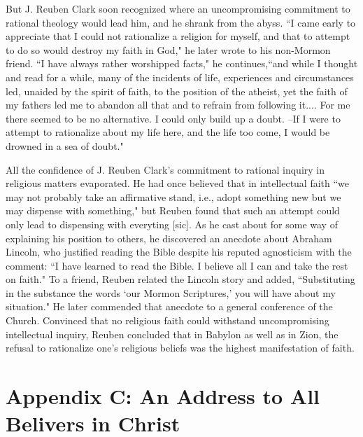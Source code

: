 \documentclass{article}
\begin{document}
But J. Reuben Clark soon recognized where an uncompromising commitment to 
rational theology would lead him, and he shrank from the abyss. 
``I came early to appreciate that I could not rationalize a religion for myself, 
and that to attempt to do so would destroy my faith in God," 
he later wrote to his non-Mormon friend. ``I have always rather worshipped 
facts," he continues,``and while I thought and read for a while, many of the 
incidents of life, experiences and circumstances led, unaided by the spirit of 
faith, to the position of the atheist, yet the faith of my fathers led me to 
abandon all that and to refrain from following it.... For me there seemed to be 
no alternative. I could only build up a doubt. --If I were to attempt to 
rationalize about my life here, and the life too come, I would be drowned in 
a sea of doubt."

All the confidence of J. Reuben Clark's commitment to rational inquiry in 
religious matters evaporated. He had once believed that in intellectual faith 
``we may not probably take an affirmative stand, i.e., adopt something new but 
we may dispense with something," but Reuben found that such an attempt could 
only lead to dispensing with everyting [sic]. As he cast about for some way of 
explaining his position to others, he discovered an anecdote about Abraham 
Lincoln, who justified reading the Bible despite his reputed agnosticism with 
the comment: ``I have learned to read the Bible. I believe all I can and take 
the rest on faith." To a friend, Reuben related the Lincoln story and added, 
``Substituting in the substance the words `our Mormon Scriptures,' you will 
have about my situation." He later commended that anecdote to a general 
conference of the Church. Convinced that no religious faith could withstand 
uncompromising intellectual inquiry, Reuben concluded that in Babylon as well 
as in Zion, the refusal to rationalize one's religious beliefs was the highest 
manifestation of faith.

\cite{clark}

\newpage

\section{Appendix C: An Address to All Belivers in Christ}
\end{document}
